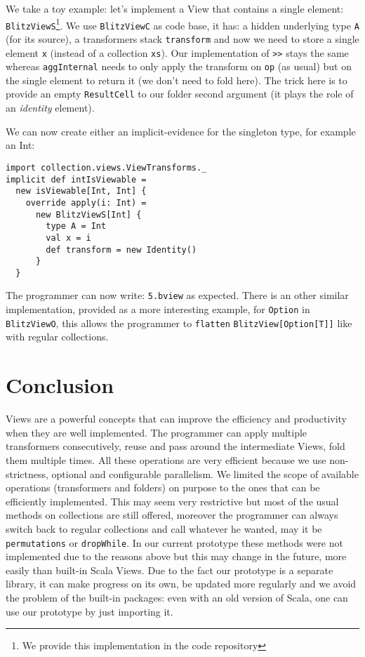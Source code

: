 \documentclass[a4paper,12pt,twocolumn]{article}
\begin{document}
We take a toy example: let's implement a View that contains a single element: \verb|BlitzViewS|\footnote{We provide this implementation in the code repository}.
We use \verb|BlitzViewC| as code base, it has: a hidden underlying type \verb|A| (for its source), a transformers stack \verb|transform| and now we need to store a single element \verb|x| (instead of a collection \verb|xs|).
Our implementation of \verb|>>| stays the same whereas \verb|aggInternal| needs to only apply the transform on \verb|op| (as usual) but on the single element to return it (we don't need to fold here).
The trick here is to provide an empty \verb|ResultCell| to our folder second argument (it plays the role of an {\it identity}\/ element).

We can now create either an implicit-evidence for the singleton type, for example an Int:
\begin{lstlisting}
import collection.views.ViewTransforms._
implicit def intIsViewable =
  new isViewable[Int, Int] {
    override apply(i: Int) =
      new BlitzViewS[Int] {
        type A = Int
        val x = i
        def transform = new Identity()
      }
  }
\end{lstlisting}
The programmer can now write: \verb|5.bview| as expected.
There is an other similar implementation, provided as a more interesting example, for \verb|Option| in \verb|BlitzViewO|, this allows the programmer to \verb|flatten| \verb|BlitzView[Option[T]]| like with regular collections.

\section{Conclusion}
Views are a powerful concepts that can improve the efficiency and productivity when they are well implemented.
The programmer can apply multiple transformers consecutively, reuse and pass around the intermediate Views, fold them multiple times.
All these operations are very efficient because we use non-strictness, optional and configurable parallelism.
We limited the scope of available operations (transformers and folders) on purpose to the ones that can be efficiently implemented.
This may seem very restrictive but most of the usual methods on collections are still offered, moreover the programmer can always switch back to regular collections and call whatever he wanted, may it be \verb|permutations| or \verb|dropWhile|.
In our current prototype these methods were not implemented due to the reasons above but this may change in the future, more easily than built-in Scala Views.
Due to the fact our prototype is a separate library, it can make progress on its own, be updated more regularly and we avoid the problem of the built-in packages: even with an old version of Scala, one can use our prototype by just importing it.
\end{document}
